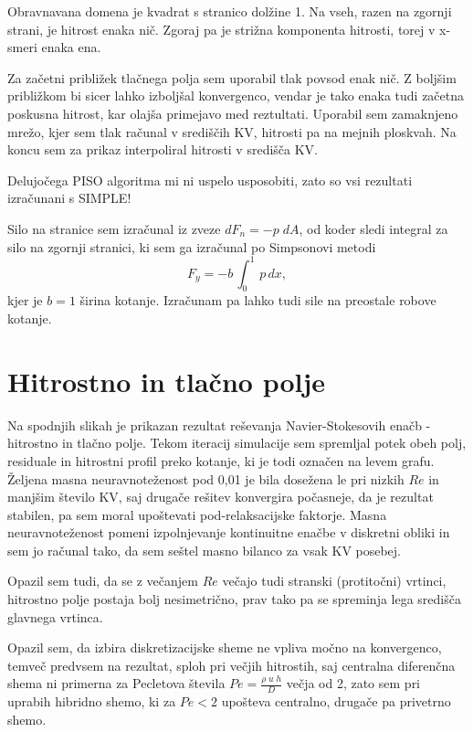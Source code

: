 Obravnavana domena je kvadrat s stranico dolžine 1. Na vseh, razen na zgornji strani, je hitrost enaka nič. Zgoraj pa je strižna komponenta hitrosti, torej v x-smeri enaka ena.

Za začetni približek tlačnega polja sem uporabil tlak povsod enak nič. Z boljšim približkom bi sicer lahko izboljšal konvergenco, vendar je tako enaka tudi začetna poskusna hitrost, kar olajša primejavo med reztultati. Uporabil sem zamaknjeno mrežo, kjer sem tlak računal v središčih KV, hitrosti pa na mejnih ploskvah. Na koncu sem za prikaz interpoliral hitrosti v središča KV.

Delujočega PISO algoritma mi ni uspelo usposobiti, zato so vsi rezultati izračunani s SIMPLE!

Silo na stranice sem izračunal iz zveze $d F_n = -p\; d A$, od koder sledi integral za silo na zgornji stranici, ki sem ga izračunal po Simpsonovi metodi
\begin{equation}
    F_y = -b\,\int_{0}^{1}\,p\,d x,
\end{equation}
kjer je $b=1$ širina kotanje. Izračunam pa lahko tudi sile na preostale robove kotanje.

\section{Hitrostno in tlačno polje}

Na spodnjih slikah je prikazan rezultat reševanja Navier-Stokesovih enačb - hitrostno in tlačno polje. Tekom iteracij simulacije sem spremljal potek obeh polj, residuale in hitrostni profil preko kotanje, ki je todi označen na levem grafu. Željena masna neuravnoteženost pod 0,01 je bila dosežena le pri nizkih $Re$ in manjšim število KV, saj drugače rešitev konvergira počasneje, da je rezultat stabilen, pa sem moral upoštevati pod-relaksacijske faktorje. Masna neuravnoteženost pomeni izpolnjevanje kontinuitne enačbe v diskretni obliki in sem jo računal tako, da sem seštel masno bilanco za vsak KV posebej.

Opazil sem tudi, da se z večanjem $Re$ večajo tudi stranski (protitočni) vrtinci, hitrostno polje postaja bolj nesimetrično, prav tako pa se spreminja lega središča glavnega vrtinca.

Opazil sem, da izbira diskretizacijske sheme ne vpliva močno na konvergenco, temveč predvsem na rezultat, sploh pri večjih hitrostih, saj centralna diferenčna shema ni primerna za Pecletova števila $Pe=\frac{\rho\;u\;h}{D}$ večja od 2, zato sem pri uprabih hibridno shemo, ki za $Pe<2$ upošteva centralno, drugače pa privetrno shemo.

